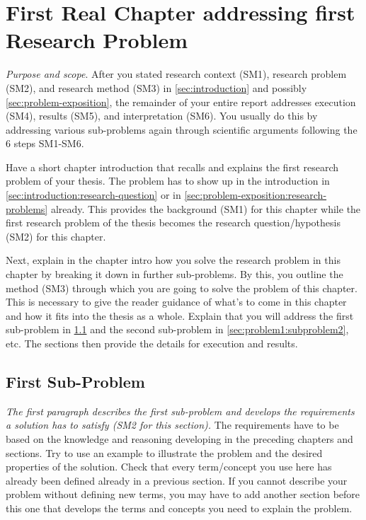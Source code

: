 \documentclass[
  fontsize=10pt
  numbers=noenddot,
  english,  %
  paper=a5,
  twoside,  %
  DIV=calc,
  headings=small,
  bibliography=totoc,
  listof=totoc,
  draft=false
]{scrbook}
\theoremstyle{break}
\begin{document}
\chapter{First Real Chapter addressing first Research Problem}\label{sec:problem1}

\emph{Purpose and scope}. After you stated research context (SM1), research problem (SM2), and research method (SM3) in \cref{sec:introduction} and possibly \cref{sec:problem-exposition}, the remainder of your entire report addresses execution (SM4), results (SM5), and interpretation (SM6). You usually do this by addressing various sub-problems again through scientific arguments following the 6 steps SM1-SM6.

Have a short chapter introduction that recalls and explains the first research problem of your thesis. The problem has to show up in the introduction in \cref{sec:introduction:research-question} or in \cref{sec:problem-exposition:research-problems} already. This provides the background (SM1) for this chapter while the first research problem of the thesis becomes the research question/hypothesis (SM2) for this chapter.

Next, explain in the chapter intro how you solve the research problem in this chapter by breaking it down in further sub-problems. By this, you outline the method (SM3) through which you are going to solve the problem of this chapter. This is necessary to give the reader guidance of what's to come in this chapter and how it fits into the thesis as a whole. Explain that you will address the first sub-problem in \cref{sec:problem1:subproblem1} and the second sub-problem in \cref{sec:problem1:subproblem2}, etc. The sections then provide the details for execution and results.

\section{First Sub-Problem}\label{sec:problem1:subproblem1}

\emph{The first paragraph describes the first sub-problem and develops the requirements a solution has to satisfy (SM2 for this section).} The requirements have to be based on the knowledge and reasoning developing in the preceding chapters and sections. Try to use an example to illustrate the problem and the desired properties of the solution. Check that every term/concept you use here has already been defined already in a previous section. If you cannot describe your problem without defining new terms, you may have to add another section before this one that develops the terms and concepts you need to explain the problem.
\end{document}
